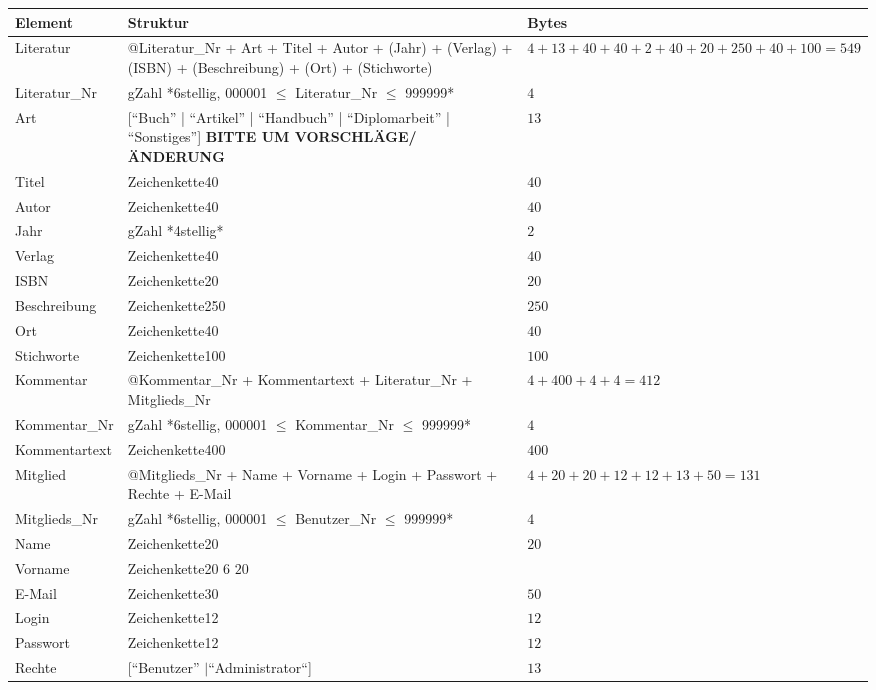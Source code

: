 \begin{longtable}{|l|p{6.0cm}|p{2cm}|}
\hline
Element & Struktur & Bytes\\
\hline\hline
\endhead

Literatur & @Literatur\_Nr + Art + Titel + Autor + (Jahr) + (Verlag) + (ISBN) + (Beschreibung) + (Ort) + (Stichworte) & $4 + 13 + 40 + 40 + 2 + 40 + 20 + 250 + 40 + 100 = 549$ \\
\hline
Literatur\_Nr & gZahl *6stellig, 000001 $\leq$ Literatur\_Nr $\leq$ 999999*  & $4$\\
\hline
Art & [``Buch'' | ``Artikel'' | ``Handbuch'' | ``Diplomarbeit'' | ``Sonstiges''] \textbf{BITTE UM VORSCHLÄGE/ÄNDERUNG}  & $13$\\
\hline
Titel & Zeichenkette40 & $40$ \\
\hline
Autor & Zeichenkette40 & $40$\\
\hline
Jahr & gZahl *4stellig* & $2$\\
\hline
Verlag & Zeichenkette40 & $40$ \\
\hline
ISBN & Zeichenkette20 & $20$  \\
\hline
Beschreibung & Zeichenkette250 & $250$ \\
\hline
Ort & Zeichenkette40 & $40$ \\
\hline
Stichworte & Zeichenkette100 & $100$\\
\hline\hline

Kommentar & @Kommentar\_Nr + Kommentartext + Literatur\_Nr + Mitglieds\_Nr & $4 + 400 + 4 + 4 = 412 $\\
\hline
Kommentar\_Nr & gZahl *6stellig, 000001 $\leq$ Kommentar\_Nr $\leq$ 999999* & $4$ \\
\hline
Kommentartext & Zeichenkette400 & $400$\\
\hline\hline

Mitglied  & @Mitglieds\_Nr  + Name + Vorname + Login + Passwort + Rechte + E-Mail & $4 + 20 + 20  + 12 + 12 + 13 + 50 = 131 $\\
\hline
Mitglieds\_Nr & gZahl *6stellig, 000001 $\leq$ Benutzer\_Nr $\leq$ 999999* & $4$ \\ 
\hline
Name & Zeichenkette20 & $20$\\
\hline
Vorname & Zeichenkette20 6 $20$ \\
\hline
E-Mail & Zeichenkette30 & $50$ \\
\hline
Login & Zeichenkette12 & $12$\\
\hline
Passwort & Zeichenkette12 & $12$\\
\hline
Rechte & [``Benutzer'' $\mid $``Administrator``] & $13$ \\
\hline\hline


\end{longtable}
